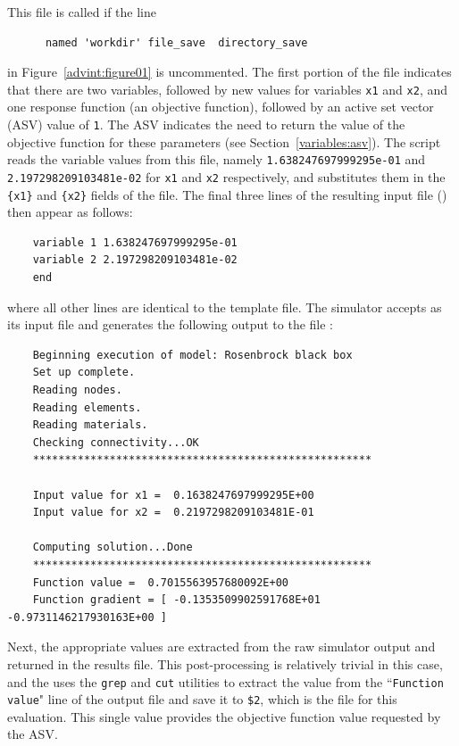 This file is called  if the line
\begin{small}
\begin{verbatim}
 	  named 'workdir' file_save  directory_save
\end{verbatim}
\end{small}
in Figure~\ref{advint:figure01} is uncommented.
The first portion of the file indicates that there are two variables,
followed by new values for variables \texttt{x1} and \texttt{x2}, and
one response function (an objective function), followed by an active
set vector (ASV) value of \texttt{1}. The ASV indicates the need to
return the value of the objective function for these parameters (see
Section~\ref{variables:asv}). The  script reads the
variable values from this file, namely \texttt{1.638247697999295e-01}
and \texttt{2.197298209103481e-02} for \texttt{x1} and \texttt{x2}
respectively, and substitutes them in the \texttt{\{x1\}} and
\texttt{\{x2\}} fields of the  file. The final
three lines of the resulting input file () then appear
as follows:
\begin{small}
\begin{verbatim}
    variable 1 1.638247697999295e-01
    variable 2 2.197298209103481e-02
    end
\end{verbatim}
\end{small}

where all other lines are identical to the template file. The
 simulator accepts  as its input
file and generates the following output to the file :
\begin{small}
\begin{verbatim}
    Beginning execution of model: Rosenbrock black box
    Set up complete.
    Reading nodes.
    Reading elements.
    Reading materials.
    Checking connectivity...OK
    *****************************************************

    Input value for x1 =  0.1638247697999295E+00
    Input value for x2 =  0.2197298209103481E-01

    Computing solution...Done
    *****************************************************
    Function value =  0.7015563957680092E+00
    Function gradient = [ -0.1353509902591768E+01 -0.9731146217930163E+00 ]
\end{verbatim}
\end{small}

Next, the appropriate values are extracted from the raw simulator output
and returned in the results file. This post-processing is relatively
trivial in this case, and the  uses the
\texttt{grep} and \texttt{cut} utilities to extract the value from the
``\texttt{Function value}" line of the  output file and save it to
\texttt{\$2}, which is the  file for this
evaluation. This single value provides the objective function value
requested by the ASV.


